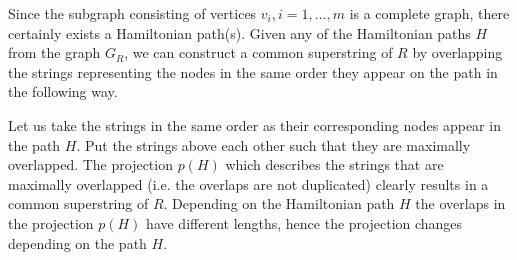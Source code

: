 \documentclass[english,twoside,censored,csm,algorithms-track-2020]{HYthesisML}
\theoremstyle{plain}
\theoremstyle{definition}
\begin{document}

Since the subgraph consisting of vertices $v_i, i=1,...,m$ is a complete graph, there certainly exists a
Hamiltonian path(s). Given any
of the Hamiltonian paths $H$ from the graph $G_R$, we can construct a common superstring of $R$ by
overlapping the strings representing the nodes in the same order they appear on the path in the
following way.

Let us take the strings in the same order as their corresponding nodes appear in the path $H$. Put the
strings above each other such that they are maximally overlapped. The projection $p(H)$ which describes
the strings that are maximally overlapped (i.e. the overlaps are not duplicated) clearly results in a
common superstring of $R$. Depending on the Hamiltonian path $H$ the overlaps in the
projection $p(H)$ have different lengths, hence the projection changes depending on the path $H$. 
\end{document}
